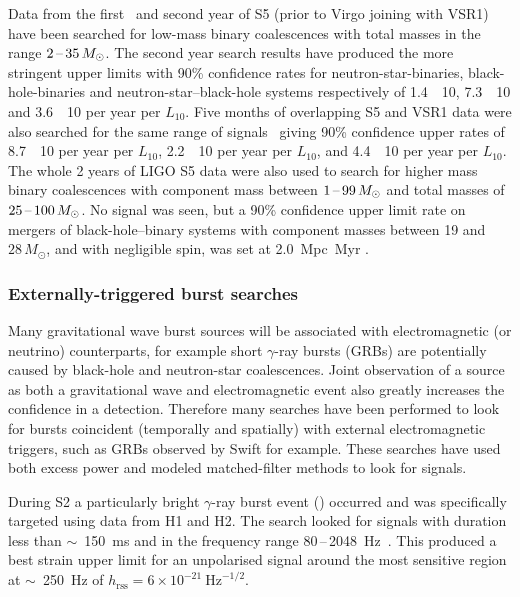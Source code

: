 Data from the first~\cite{Abbott:2009e} and second year of S5 (prior to Virgo
joining with VSR1)~\cite{Abbott:2009f} have been searched for low-mass binary
coalescences with total masses in the range $2\mbox{\,--\,}35\,M_{\odot}$. The second
year search results have produced the more stringent upper limits with 90\%
confidence rates for neutron-star-binaries, black-hole-binaries and neutron-star--black-hole systems respectively of 1.4~\texttimes~10,
7.3~\texttimes~10 and 3.6~\texttimes~10 per year
per $L_{10}$. Five months of overlapping S5 and VSR1 data were also
searched for the same range of signals~\cite{Abadie:2010f} giving 90\%
confidence upper rates of 8.7~\texttimes~10 per year per
$L_{10}$, 2.2~\texttimes~10 per year per $L_{10}$, and
4.4~\texttimes~10 per year per $L_{10}$. The whole 2 years
of LIGO S5 data were also used to search for higher mass binary
coalescences with component mass between $1\mbox{\,--\,}99\,M_{\odot}$
and total masses of $25\mbox{\,--\,}100\,M_{\odot}$. No signal was
seen, but a 90\% confidence upper limit rate on mergers of black-hole--binary systems with component masses between 19 and
$28\,M_{\odot}$, and with negligible spin, was set at
2.0~Mpc~Myr \cite{Abadie:2011a}.


\subsubsection{Externally-triggered burst searches}


Many gravitational wave burst sources will be associated with electromagnetic
(or neutrino) counterparts, for example short $\gamma$-ray bursts (GRBs) are
potentially caused by black-hole and neutron-star coalescences. Joint
observation of a source as both a gravitational wave and electromagnetic
event also greatly increases the confidence in a detection. Therefore many
searches have been performed to look for bursts coincident (temporally and
spatially) with external electromagnetic triggers, such as GRBs observed by
Swift for example. These searches have used both excess power and modeled
matched-filter methods to look for signals.


During S2 a particularly bright $\gamma$-ray burst event () occurred
and was specifically targeted using data from H1 and H2. The search looked for
signals with duration less than $\sim$~150~ms and in the frequency range
80\,--\,2048~Hz~\cite{Abbott:2005d}. This produced a best strain upper limit for an
unpolarised signal around the most sensitive region at  $\sim$~250~Hz
of $h_{\mathrm{rss}}=6\times10^{-21} \mathrm{\ Hz}^{-1/2}$.


